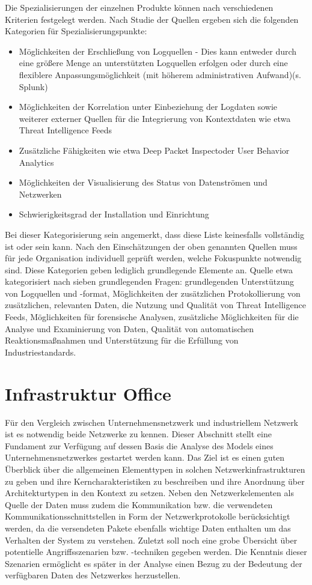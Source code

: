 Die Spezialisierungen der einzelnen Produkte können nach verschiedenen Kriterien festgelegt werden. Nach Studie der Quellen ergeben sich die folgenden Kategorien für Spezialisierungspunkte:
\begin{itemize}
\item Möglichkeiten der Erschließung von Logquellen - Dies kann entweder durch eine größere Menge an unterstützten Logquellen erfolgen oder durch eine flexiblere Anpassungsmöglichkeit (mit höherem administrativen Aufwand)(s. Splunk)
\item Möglichkeiten der Korrelation unter Einbeziehung der Logdaten sowie weiterer externer Quellen für die Integrierung von Kontextdaten wie etwa Threat Intelligence Feeds
\item Zusätzliche Fähigkeiten wie etwa \glqq Deep Packet Inspect\grqq  oder \glqq User Behavior Analytics\grqq
\item Möglichkeiten der Visualisierung des Status von Datenströmen und Netzwerken
\item Schwierigkeitsgrad der Installation und Einrichtung
\end{itemize}

Bei dieser Kategorisierung sein angemerkt, dass diese Liste keinesfalls vollständig ist oder sein kann. Nach den Einschätzungen der oben genannten Quellen muss für jede Organisation individuell geprüft werden, welche Fokuspunkte notwendig sind. Diese Kategorien geben lediglich grundlegende Elemente an.
Quelle 
etwa kategorisiert nach sieben grundlegenden Fragen: grundlegenden Unterstützung von Logquellen und -format, Möglichkeiten der zusätzlichen Protokollierung von zusätzlichen, relevanten Daten, die Nutzung und Qualität von Threat Intelligence Feeds, Möglichkeiten für forensische Analysen, zusätzliche Möglichkeiten für die Analyse und Examinierung von Daten, Qualität von automatischen Reaktionsmaßnahmen und Unterstützung für die Erfüllung von Industriestandards. 


\section{Infrastruktur Office}
Für den Vergleich zwischen Unternehmensnetzwerk und industriellem Netzwerk ist es notwendig beide Netzwerke zu kennen. Dieser Abschnitt stellt eine Fundament zur Verfügung auf dessen Basis die Analyse des Models eines Unternehmensnetzwerkes gestartet werden kann. Das Ziel ist es einen guten Überblick über die allgemeinen Elementtypen in solchen Netzwerkinfrastrukturen zu geben und ihre Kerncharakteristiken zu beschreiben und ihre Anordnung über Architekturtypen in den Kontext zu setzen. Neben den Netzwerkelementen als Quelle der Daten muss zudem die Kommunikation bzw. die verwendeten Kommunikationsschnittstellen in Form der Netzwerkprotokolle berücksichtigt werden, da die versendeten Pakete ebenfalls wichtige Daten enthalten um das Verhalten der System zu verstehen. Zuletzt soll noch eine grobe Übersicht über potentielle Angriffsszenarien bzw. -techniken gegeben werden. Die Kenntnis dieser Szenarien ermöglicht es später in der Analyse einen Bezug zu der Bedeutung der verfügbaren Daten des Netzwerkes herzustellen.

